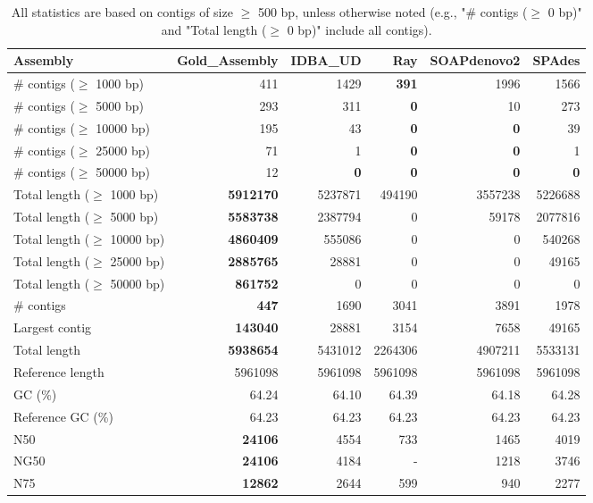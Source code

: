 \documentclass[12pt,a4paper]{article}
\begin{document}
\begin{table}[ht]
\begin{center}
\caption{All statistics are based on contigs of size $\geq$ 500 bp, unless otherwise noted (e.g., "\# contigs ($\geq$ 0 bp)" and "Total length ($\geq$ 0 bp)" include all contigs).}
\begin{tabular}{|l*{5}{|r}|}
\hline
Assembly & Gold\_Assembly & IDBA\_UD & Ray & SOAPdenovo2 & SPAdes \\ \hline
\# contigs ($\geq$ 1000 bp) & 411 & 1429 & {\bf 391} & 1996 & 1566 \\ \hline
\# contigs ($\geq$ 5000 bp) & 293 & 311 & {\bf 0} & 10 & 273 \\ \hline
\# contigs ($\geq$ 10000 bp) & 195 & 43 & {\bf 0} & {\bf 0} & 39 \\ \hline
\# contigs ($\geq$ 25000 bp) & 71 & 1 & {\bf 0} & {\bf 0} & 1 \\ \hline
\# contigs ($\geq$ 50000 bp) & 12 & {\bf 0} & {\bf 0} & {\bf 0} & {\bf 0} \\ \hline
Total length ($\geq$ 1000 bp) & {\bf 5912170} & 5237871 & 494190 & 3557238 & 5226688 \\ \hline
Total length ($\geq$ 5000 bp) & {\bf 5583738} & 2387794 & 0 & 59178 & 2077816 \\ \hline
Total length ($\geq$ 10000 bp) & {\bf 4860409} & 555086 & 0 & 0 & 540268 \\ \hline
Total length ($\geq$ 25000 bp) & {\bf 2885765} & 28881 & 0 & 0 & 49165 \\ \hline
Total length ($\geq$ 50000 bp) & {\bf 861752} & 0 & 0 & 0 & 0 \\ \hline
\# contigs & {\bf 447} & 1690 & 3041 & 3891 & 1978 \\ \hline
Largest contig & {\bf 143040} & 28881 & 3154 & 7658 & 49165 \\ \hline
Total length & {\bf 5938654} & 5431012 & 2264306 & 4907211 & 5533131 \\ \hline
Reference length & 5961098 & 5961098 & 5961098 & 5961098 & 5961098 \\ \hline
GC (\%) & 64.24 & 64.10 & 64.39 & 64.18 & 64.28 \\ \hline
Reference GC (\%) & 64.23 & 64.23 & 64.23 & 64.23 & 64.23 \\ \hline
N50 & {\bf 24106} & 4554 & 733 & 1465 & 4019 \\ \hline
NG50 & {\bf 24106} & 4184 & - & 1218 & 3746 \\ \hline
N75 & {\bf 12862} & 2644 & 599 & 940 & 2277 \\ \hline

\end{tabular}
\end{center}
\end{table}
\end{document}
